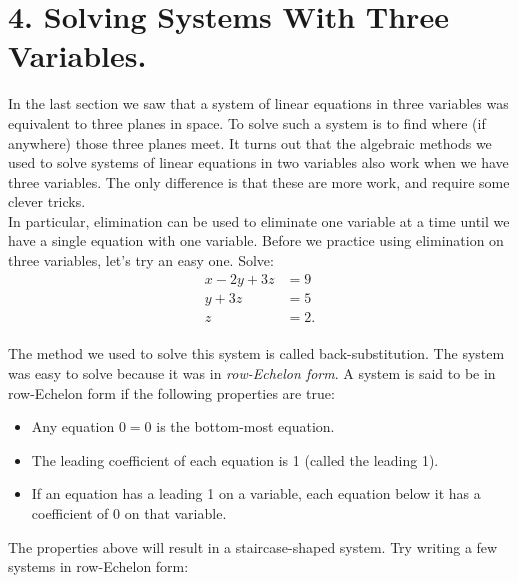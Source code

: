 \documentclass[12pt,fleqn]{book}
\begin{document}
\chapter{4. Solving Systems With Three Variables.}
In the last section we saw that a system of linear equations in three variables was equivalent to three planes in space.  To solve such a system is to find where (if anywhere) those three planes meet.  It turns out that the algebraic methods we used to solve systems of linear equations in two variables also work when we have three variables.  The only difference is that these are more work, and require some clever tricks.
\\[1em]
In particular, elimination can be used to eliminate one variable at a time until we have a single equation with one variable.  Before we practice using elimination on three variables, let's try an easy one.  Solve:
\begin{align*}
	x-2y+3z & =9  \\
	y+3z    & =5  \\
	z       & =2.
\end{align*}
\\[2in]
The method we used to solve this system is called back-substitution.  The system was easy to solve because it was in \emph{row-Echelon form}.  A system is said to be in row-Echelon form if the following properties are true:
\begin{itemize}
	\item Any equation $0=0$ is the bottom-most equation.
	\item The leading coefficient of each equation is 1 (called the leading 1).
	\item If an equation has a leading 1 on a variable, each equation below it has a coefficient of 0 on that variable.
\end{itemize}
The properties above will result in a staircase-shaped system.  Try writing a few systems in row-Echelon form:
\vspace{2in}
\end{document}
